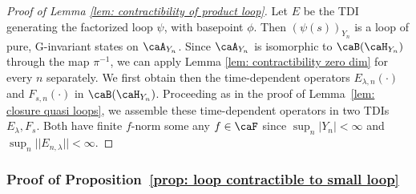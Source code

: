 \begin{proof}[Proof of Lemma \ref{lem: contractibility of product loop}]
	Let $E$ be the TDI generating the factorized loop $\psi$, with basepoint $\phi$. 
	Then $(\psi(s))_{Y_n}$ is a loop of pure, G-invariant states on $\caA_{Y_n}$.
	Since $\caA_{Y_n}$ is isomorphic to $\caB(\caH_{Y_n})$ through the map $\pi^{-1}$, we can apply Lemma \ref{lem: contractibility zero dim} for every $n$ separately. We first obtain then the time-dependent operators $E_{\lambda,n}(\cdot)$ and $F_{s,n}(\cdot)$ in $\caB(\caH_{Y_n})$.
	Proceeding as in the proof of Lemma~\ref{lem: closure quasi loops}, we assemble these time-dependent operators in two TDIs $E_\lambda,F_s$.
	Both have finite $f$-norm some any $f\in\caF$ since $\sup_n|Y_n|<\infty$ and $\sup_n||E_{n,\lambda}||<\infty$.
\end{proof}






\subsubsection{Proof of Proposition~\ref{prop: loop contractible to small loop}}

